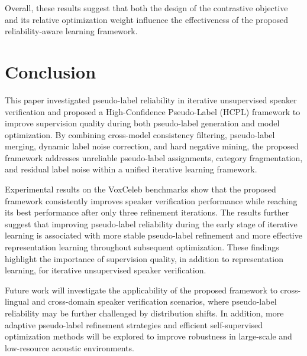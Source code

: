 \documentclass[lettersize,journal]{IEEEtran}
\begin{document}
 Overall, these results suggest that both the design of the contrastive objective and its relative optimization weight influence the effectiveness of the proposed reliability-aware learning framework.



\section{Conclusion}

This paper investigated pseudo-label reliability in iterative unsupervised speaker verification and proposed a High-Confidence Pseudo-Label (HCPL) framework to improve supervision quality during both pseudo-label generation and model optimization. By combining cross-model consistency filtering, pseudo-label merging, dynamic label noise correction, and hard negative mining, the proposed framework addresses unreliable pseudo-label assignments, category fragmentation, and residual label noise within a unified iterative learning framework.

Experimental results on the VoxCeleb benchmarks show that the proposed framework consistently improves speaker verification performance while reaching its best performance after only three refinement iterations. The results further suggest that improving pseudo-label reliability during the early stage of iterative learning is associated with more stable pseudo-label refinement and more effective representation learning throughout subsequent optimization. These findings highlight the importance of supervision quality, in addition to representation learning, for iterative unsupervised speaker verification.

Future work will investigate the applicability of the proposed framework to cross-lingual and cross-domain speaker verification scenarios, where pseudo-label reliability may be further challenged by distribution shifts. In addition, more adaptive pseudo-label refinement strategies and efficient self-supervised optimization methods will be explored to improve robustness in large-scale and low-resource acoustic environments.

% 
\nocite{*}






\end{document}
